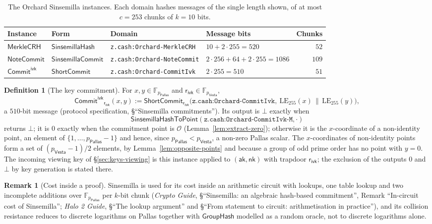\documentclass[11pt,a4paper]{article}
\theoremstyle{definition}
\newtheorem{definition}[theorem]{Definition}
\newtheorem{remark}[theorem]{Remark}
\newcommand{\F}{\mathbb{F}}
\newcommand{\Pallas}{\ensuremath{\mathsf{Pallas}}}
\newcommand{\Vesta}{\ensuremath{\mathsf{Vesta}}}
\newcommand{\NoteCommit}{\ensuremath{\mathsf{NoteCommit}}}
\newcommand{\ShortCommit}{\ensuremath{\mathsf{ShortCommit}}}
\newcommand{\CommitIvk}{\ensuremath{\mathsf{Commit}^{\mathsf{ivk}}}}
\newcommand{\GroupHash}{\ensuremath{\mathsf{GroupHash}}}
\newcommand{\aksym}{\ensuremath{\mathsf{ak}}}
\newcommand{\nksym}{\ensuremath{\mathsf{nk}}}
\newcommand{\rivk}{\ensuremath{\mathsf{r_{ivk}}}}
\begin{document}
\begin{table}[ht]
\centering\small
\setlength{\tabcolsep}{5pt}
\begin{tabular}{@{}llllr@{}}
\toprule
Instance & Form & Domain & Message bits & Chunks \\
\midrule
$\mathsf{MerkleCRH}$ & $\mathsf{SinsemillaHash}$
  & \texttt{z.cash:Orchard-MerkleCRH} & $10 + 2 \cdot 255 = 520$ & $52$ \\
$\NoteCommit$ & $\mathsf{SinsemillaCommit}$
  & \texttt{z.cash:Orchard-NoteCommit}
  & $2 \cdot 256 + 64 + 2 \cdot 255 = 1086$ & $109$ \\
$\CommitIvk$ & $\ShortCommit$
  & \texttt{z.cash:Orchard-CommitIvk} & $2 \cdot 255 = 510$ & $51$ \\
\bottomrule
\end{tabular}
\caption{The Orchard Sinsemilla instances. Each domain hashes messages of
the single length shown, of at most $c = 253$ chunks of $k = 10$ bits.}
\label{tab:prim-sinsemilla}
\end{table}

\begin{definition}[The key commitment]
For $x, y \in \F_{p_{\Pallas}}$ and $\rivk \in \F_{p_{\Vesta}}$,
\[
  \CommitIvk_{\rivk}(x, y) := \ShortCommit_{\rivk}\bigl(
    \texttt{z.cash:Orchard-CommitIvk},\
    \mathrm{LE}_{255}(x) \,\|\, \mathrm{LE}_{255}(y)\bigr),
\]
a $510$-bit message (protocol specification, \S``Sinsemilla
commitments''). Its output is $\bot$ exactly when
\[
  \mathsf{SinsemillaHashToPoint}(\texttt{z.cash:Orchard-CommitIvk-M}, \cdot)
\]
returns $\bot$; it is $0$ exactly when the commitment point is
$\mathcal{O}$ (Lemma~\ref{lem:extract-zero}); otherwise it is the
$x$-coordinate of a non-identity point, an element of
$\{1, \dots, p_{\Pallas} - 1\}$ and hence, since $p_{\Pallas} < p_{\Vesta}$,
a non-zero Pallas scalar. The $x$-coordinates of non-identity points form a
set of $(p_{\Vesta} - 1)/2$ elements, by Lemma~\ref{lem:opposite-points} and
because a group of odd prime order has no point with $y = 0$. The incoming
viewing key of \S\ref{sec:keys-viewing} is this instance applied to
$(\aksym, \nksym)$ with trapdoor $\rivk$; the exclusion of the outputs $0$
and $\bot$ by key generation is stated there.
\end{definition}

\begin{remark}[Cost inside a proof]
Sinsemilla is used for its cost inside an arithmetic circuit with lookups,
one table lookup and two incomplete additions over $\F_{p_{\Pallas}}$ per
$k$-bit chunk (\emph{Crypto Guide}, \S``Sinsemilla: an algebraic hash-based
commitment'', Remark ``In-circuit cost of Sinsemilla'';
\emph{Halo 2 Guide}, \S``The lookup argument'' and
\S``From statement to circuit: arithmetisation in practice''), and its
collision resistance reduces to discrete logarithms on Pallas together with
$\GroupHash$ modelled as a random oracle, not to discrete logarithms alone.
\end{remark}
\end{document}
